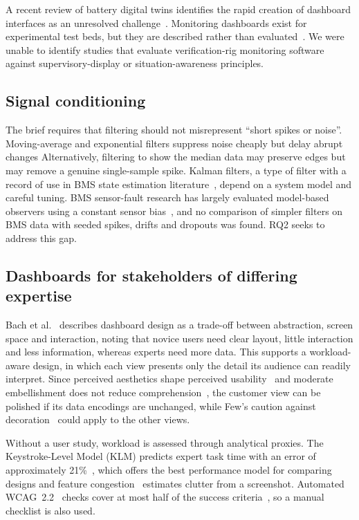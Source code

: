 A recent review of battery digital twins identifies the rapid creation of dashboard interfaces as an unresolved challenge~\cite{naseri2023batterydt}.
Monitoring dashboards exist for experimental test beds, but they are described rather than evaluated~\cite{darkside2025grafana}.
We were unable to identify studies that evaluate verification-rig monitoring software against supervisory-display or situation-awareness principles.

\subsection{Signal conditioning}\label{subsec:signal-conditioning}
The brief requires that filtering should not misrepresent ``short spikes or noise''.
Moving-average and exponential filters suppress noise cheaply but delay abrupt changes
Alternatively, filtering to show the median data may preserve edges but may remove a genuine single-sample spike.
Kalman filters, a type of filter with a record of use in BMS state estimation literature~\cite{STETZEL2015490}, depend on a system model and careful tuning.
BMS sensor-fault research has largely evaluated model-based observers using a constant sensor bias~\cite{yu2021sensorfault}, and no comparison of simpler filters on BMS data with seeded spikes, drifts and dropouts was found.
RQ2 seeks to address this gap.

\subsection{Dashboards for stakeholders of differing expertise}\label{subsec:dashboard-evaluation}
Bach et al.~\cite{bach2023dashboard} describes dashboard design as a trade-off between abstraction, screen space and interaction, noting that novice users need clear layout, little interaction and less information, whereas experts need more data.
This supports a workload-aware design, in which each view presents only the detail its audience can readily interpret.
Since perceived aesthetics shape perceived usability~\cite{tractinsky2000beautiful} and moderate embellishment does not reduce comprehension~\cite{bateman2010useful}, the customer view can be polished if its data encodings are unchanged, while Few's caution against decoration~\cite{few2013dashboard} could apply to the other views.

Without a user study, workload is assessed through analytical proxies.
The Keystroke-Level Model (KLM) predicts expert task time with an error of approximately 21\%~\cite{card1980keystroke}, which offers the best performance model for comparing designs and feature congestion~\cite{rosenholtz2007clutter} estimates clutter from a screenshot.
Automated WCAG~2.2~\cite{w3c2023wcag} checks cover at most half of the success criteria~\cite{vigo2013benchmarking}, so a manual checklist is also used.

